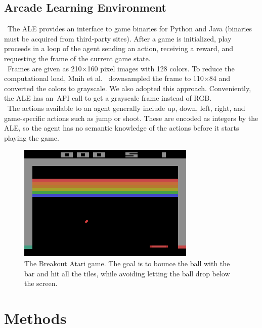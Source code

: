 \documentclass[conference]{IEEEtran}
\begin{document}
\subsection{Arcade Learning Environment}
\noindent\ The ALE provides an interface to game binaries for Python and Java
(binaries must be acquired from third-party sites). After a game is
initialized, play proceeds in a loop of the agent sending an action, receiving
a reward, and requesting the frame of the current game state.\\
\indent\ Frames are given as 210$\times$160 pixel images with 128 colors. To
reduce the computational load, Mnih et al.~\cite{mnih2013playing} downsampled
the frame to 110$\times$84 and converted the colors to grayscale. We also
adopted this approach. Conveniently, the ALE has an\ API call to get a
grayscale frame instead of RGB.\\
\indent\ The actions available to an agent generally include up, down, left,
right, and game-specific actions such as jump or shoot. These are encoded as
integers by the ALE, so the agent has no semantic knowledge of the actions
before it starts playing the game.

\begin{figure}[tp]
    \includegraphics[width=\columnwidth]{breakout_frame}
    \caption{The Breakout Atari game. The goal is to bounce the ball with
    the bar and hit all the tiles, while avoiding letting the ball drop
    below the screen.}
\end{figure}

\section{Methods}
\end{document}
